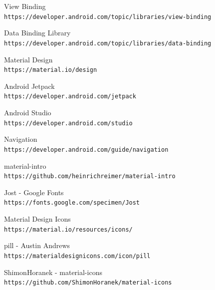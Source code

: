 \documentclass[a4paper,12pt]{report}
\begin{document}
\renewcommand\bibname{Bibliografie}
\begin{thebibliography}{9}

View Binding
\\\texttt{https://developer.android.com/topic/libraries/view-binding}

Data Binding Library
\\\texttt{https://developer.android.com/topic/libraries/data-binding}

Material Design
\\\texttt{https://material.io/design}

Android Jetpack
\\\texttt{https://developer.android.com/jetpack}

Android Studio
\\\texttt{https://developer.android.com/studio}

Navigation
\\\texttt{https://developer.android.com/guide/navigation}


material-intro
\\\texttt{https://github.com/heinrichreimer/material-intro}

Jost - Google Fonts
\\\texttt{https://fonts.google.com/specimen/Jost}


Material Design Icons
\\\texttt{https://material.io/resources/icons/}

pill - Austin Andrews
\\\texttt{https://materialdesignicons.com/icon/pill}

ShimonHoranek - material-icons 
\\\texttt{https://github.com/ShimonHoranek/material-icons}



\end{thebibliography}
\end{document}
